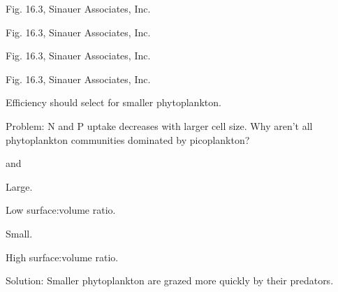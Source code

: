 \documentclass[t]{beamer}
\begin{document}
%
{
\begin{frame}[b]

	\hfill \tiny Fig. 16.3, \textcopyright Sinauer Associates, Inc.
\end{frame}
}
%
{
\begin{frame}[b]

	\hfill \tiny Fig. 16.3, \textcopyright Sinauer Associates, Inc.
\end{frame}
}
%
{
\begin{frame}[b]

	\hfill \tiny Fig. 16.3, \textcopyright Sinauer Associates, Inc.
\end{frame}
}
%
{
\begin{frame}[b]

	\hfill \tiny Fig. 16.3, \textcopyright Sinauer Associates, Inc.
\end{frame}
}
%
\begin{frame}[t]{Efficiency should select for smaller phytoplankton.}

\hangpara Problem: N and P uptake decreases with larger cell size. Why aren't all phytoplankton communities dominated by picoplankton?

\begin{multicols}{2}

		\hangpara {} and 

		\hangpara Large.
		
		\hangpara Low surface:volume ratio.
				
\columnbreak

		\hangpara {}

		\hangpara Small.

		\hangpara High surface:volume ratio.
		
\end{multicols}

\pause

\hangpara Solution: Smaller phytoplankton are grazed more quickly by their predators.

\end{frame}
%
\end{document}
